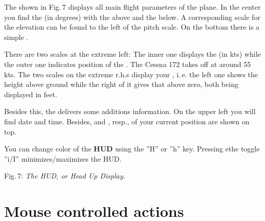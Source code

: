 The  shown in Fig.\,7  displays all main flight parameters of the plane. In
the center you find the  (in degrees) with the  above and the  below. A corresponding scale for the
elevation can be found to the left of the pitch scale. On the
bottom there is a simple .

There are two scales at the extreme left: The inner one displays the  (in
kts) while the outer one indicates position of the . The Cessna 172 takes
off at around 55 kts. The two scales on the extreme r.h.s display your ,
i.\,e. the left one shows the height above ground while the right of it gives that above
zero, both being displayed in feet.

Besides this, the  delivers some additions information. On the upper left you
will find date and time. Besides,   and , resp., of your current position are shown on top.

You can change color of the \textbf{HUD} using the ''H'' or ''h''  key. Pressing ethe toggle ''i/I'' minimizes/maximizes the HUD.

\medskip

 \centerline{}

\smallskip
 \noindent
Fig.\,7: \textit{The HUD, or Head Up Display.}
\medskip

\section{Mouse controlled actions}


